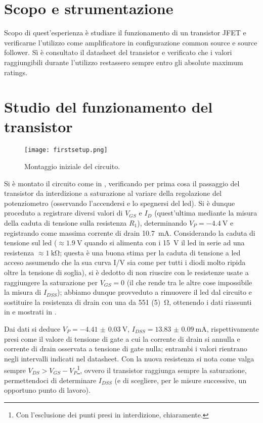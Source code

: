 \section{Scopo e strumentazione}

Scopo di quest'esperienza è studiare il funzionamento di un transistor JFET e verificarne l'utilizzo come amplificatore in configurazione common source e source follower.
Sì è consultato il datasheet del transistor e verificato che i valori raggiungibili durante l'utilizzo restassero sempre entro gli absolute maximum ratings.

\section{Studio del funzionamento del transistor}

\begin{figure}[h]
	\centering
	\texttt{[image: firstsetup.png]}
	\caption{Montaggio iniziale del circuito.}
	\label{f:setup_inizio}
\end{figure}

Si è montato il circuito come in , verificando per prima cosa il passaggio del transistor da interdizione a saturazione al variare della regolazione del potenziometro (osservando l'accendersi e lo spegnersi del led). Si è dunque proceduto a registrare diversi valori di $V_{GS}$ e $I_D$ (quest'ultima mediante la misura della caduta di tensione sulla resistenza $R_1$), determinando $V_P = \SI{-4.4}{\V}$ e registrando come massima corrente di drain \SI{10.7}{\mA}. Considerando la caduta di tensione sul led ($\approx \SI{1.9}{\V}$ quando si alimenta con i \SI{+15}{\V} il led in serie ad una resistenza $\approx\SI{1}{\kohm}$; questa è una buona stima per la caduta di tensione a led acceso assumendo che la sua curva I/V sia come per tutti i diodi molto ripida oltre la tensione di soglia), si è dedotto di non riuscire con le resistenze usate a raggiungere la saturazione per $V_{GS} = 0$ (il che rende tra le altre cose impossibile la misura di $I_{DSS}$); abbiamo dunque provveduto a rimuovere il led dal circuito e sostituire la resistenza di drain con una da \SI{551 (5)}{\ohm}, ottenendo i dati riassunti in  e mostrati in .

Dai dati si deduce $V_P = \SI{-4.41(3)}{\V}$, $I_{DSS} = \SI{13.83(9)}{\mA}$, rispettivamente presi come il valore di tensione di gate a cui la corrente di drain si annulla e corrente di drain osservata a tensione di gate nulla; entrambi i valori rientrano negli intervalli  indicati nel datasheet. Con la nuova resistenza si nota come valga sempre $V_{DS} > V_{GS} - V_P$\footnote{Con l'esclusione dei punti presi in interdizione, chiaramente.}, ovvero il transistor raggiunga sempre la saturazione, permettendoci di determinare $I_{DSS}$ (e di scegliere, per le misure successive, un opportuno punto di lavoro).


